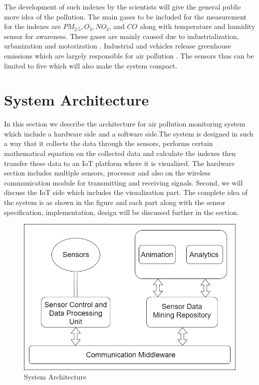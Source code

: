 \documentclass[12pt,a4paper,oneside]{report}
\begin{document}
The development of such indexes by the scientists will give the general public more idea of the pollution. The main gases to be included for the measurement for the indexes are  $PM_{2.5}, O_3, NO_2$, and $CO$ along with temperature and humidity sensor for awareness. These gases are mainly caused due to industrialization, urbanization and motorization \cite{Saha1952}. Industrial and vehicles release greenhouse emissions which are largely responsible for air pollution \cite{ internet}. The sensors thus can be limited to five which will also make the system compact.

\section*{System Architecture}
    
     In this section we describe the architecture for air pollution monitoring system which include a hardware side and a software side.The system is designed in such a way that it collects the data through the sensors, performs certain mathematical equation on the collected data and calculate the indexes then transfer these data to an IoT platform where it is visualized. The hardware section includes multiple sensors, processor and also on the wireless communication module for transmitting and receiving signals. Second, we will discuss the IoT side which includes the visualization part. The complete idea of the system is as shown in the figure and each part along with the sensor specification, implementation, design will be discussed further in the section. 


     \begin{figure}[h]
      \begin{center}
      \includegraphics[scale=0.70]{images/figure2.png}
      \end{center}
      \caption{System Architecture}
      \label{mesh}
  
    \end{figure}
\end{document}
